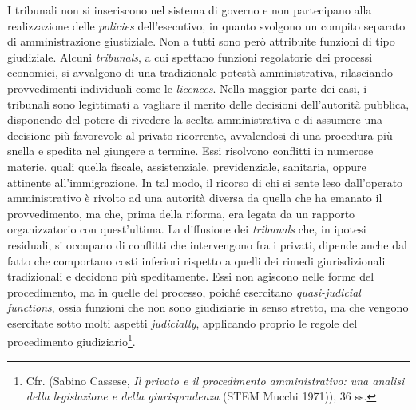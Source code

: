 \documentclass[12pt,it,a4paper,]{report}
\begin{document}
I tribunali non si inseriscono nel sistema di governo e non partecipano
alla realizzazione delle \emph{policies} dell'esecutivo, in quanto
svolgono un compito separato di amministrazione giustiziale. Non a tutti
sono però attribuite funzioni di tipo giudiziale. Alcuni
\emph{tribunals}, a cui spettano funzioni regolatorie dei processi
economici, si avvalgono di una tradizionale potestà amministrativa,
rilasciando provvedimenti individuali come le \emph{licences}. Nella
maggior parte dei casi, i tribunali sono legittimati a vagliare il
merito delle decisioni dell'autorità pubblica, disponendo del potere di
rivedere la scelta amministrativa e di assumere una decisione più
favorevole al privato ricorrente, avvalendosi di una procedura più
snella e spedita nel giungere a termine. Essi risolvono conflitti in
numerose materie, quali quella fiscale, assistenziale, previdenziale,
sanitaria, oppure attinente all'immigrazione. In tal modo, il ricorso di
chi si sente leso dall'operato amministrativo è rivolto ad una autorità
diversa da quella che ha emanato il provvedimento, ma che, prima della
riforma, era legata da un rapporto organizzatorio con quest'ultima. La
diffusione dei \emph{tribunals} che, in ipotesi residuali, si occupano
di conflitti che intervengono fra i privati, dipende anche dal fatto che
comportano costi inferiori rispetto a quelli dei rimedi giurisdizionali
tradizionali e decidono più speditamente. Essi non agiscono nelle forme
del procedimento, ma in quelle del processo, poiché esercitano
\emph{quasi-judicial functions}, ossia funzioni che non sono giudiziarie
in senso stretto, ma che vengono esercitate sotto molti aspetti
\emph{judicially}, applicando proprio le regole del procedimento
giudiziario\footnote{Cfr. (Sabino Cassese, \emph{Il privato e il
  procedimento amministrativo: una analisi della legislazione e della
  giurisprudenza} (STEM Mucchi 1971)), 36 ss.}.
\end{document}
